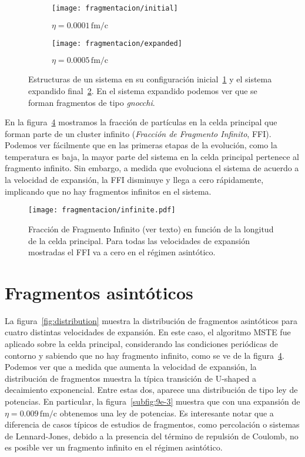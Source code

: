 \begin{figure} \centering
  \begin{subfigure}[h!]{0.45\columnwidth}
    \texttt{[image: fragmentacion/initial]}
    \caption{$\eta = 0.0001\,\text{fm/c}$}
    \label{subfig:initial}
  \end{subfigure}
  \begin{subfigure}[h!]{0.45\columnwidth}
    \texttt{[image: fragmentacion/expanded]}
    \caption{$\eta = 0.0005\,\text{fm/c}$}
    \label{subfig:expanded}
  \end{subfigure}
  \caption{Estructuras de un sistema en su configuración inicial~\ref{subfig:initial} y el sistema expandido final~\ref{subfig:expanded}.
    En el sistema expandido podemos ver que se forman fragmentos de tipo \emph{gnocchi}.}
  \label{fig:morpho_frag}
\end{figure}

En la figura~\ref{fig:infinite} mostramos la fracción de partículas en la celda principal que forman parte de un cluster infinito (\emph{Fracción de Fragmento Infinito}, FFI).
Podemos ver fácilmente que en las primeras etapas de la evolución, como la temperatura es baja, la mayor parte del sistema en la celda principal pertenece al fragmento infinito.
Sin embargo, a medida que evoluciona el sistema de acuerdo a la velocidad de expansión, la FFI disminuye y llega a cero rápidamente, implicando que no hay fragmentos infinitos en el sistema.

\begin{figure}
  \centering
  \texttt{[image: fragmentacion/infinite.pdf]}
  \caption{Fracción de Fragmento Infinito (ver texto) en función de la longitud de la celda principal.
    Para todas las velocidades de expansión mostradas el FFI va a cero en el régimen asintótico.}
  \label{fig:infinite}
\end{figure}

\section{Fragmentos asintóticos}

La figura~\ref{fig:distribution} muestra la distribución de fragmentos asintóticos para cuatro distintas velocidades de expansión.
En este caso, el algoritmo MSTE fue aplicado sobre la celda principal, considerando las condiciones periódicas de contorno y sabiendo que no hay fragmento infinito, como se ve de la figura~\ref{fig:infinite}.
Podemos ver que a medida que aumenta la velocidad de expansión, la distribución de fragmentos muestra la típica transición de U-shaped a decaimiento exponencial.
Entre estas dos, aparece una distribución de tipo ley de potencias.
En particular, la figura~\ref{subfig:9e-3} muestra que con una expansión de $\eta = 0.009\,\text{fm/c}$ obtenemos una ley de potencias.
Es interesante notar que a diferencia de casos típicos de estudios de fragmentos, como percolación o sistemas de Lennard-Jones, debido a la presencia del término de repulsión de Coulomb, no es posible ver un fragmento infinito en el régimen asintótico.

